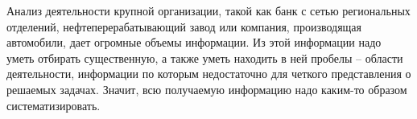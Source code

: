 Анализ деятельности крупной организации, такой как банк с сетью региональных отделений, нефтеперерабатывающий завод или компания, производящая автомобили, дает огромные объемы информации. Из этой информации надо уметь отбирать существенную, а также уметь находить в ней пробелы – области деятельности, информации по которым недостаточно для четкого представления о решаемых задачах. Значит, всю получаемую информацию надо каким-то образом систематизировать.



